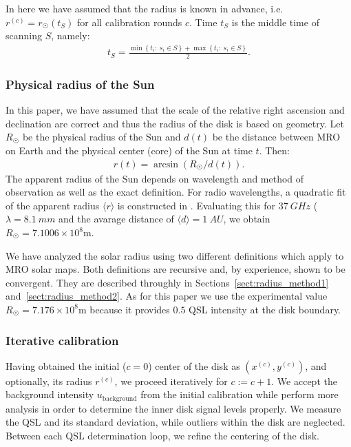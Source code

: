 \documentclass{aa}
\newcommand{\eqnl}[2]{\begin{eqnarray}\label{#1}#2\end{eqnarray}}
\newcommand{\ave}[1]{\langle #1 \rangle}
\renewcommand{\min}[1]{\operatorname{min} \left\{ #1 \right\}}
\renewcommand{\max}[1]{\operatorname{max} \left\{ #1 \right\}}
\newcommand{\s}[2]{{#1}_{\mathrm{#2}}}
\begin{document}
  In here we have assumed that the radius is known in advance, i.e. $r^{(c)} = r_{\astrosun}(t_S)$ for all calibration rounds $c$. Time $t_S$ is the middle time of scanning $S$, namely:
  \eqnl{initial_radius_time}{
  t_S = \frac{\min{t_i :\; s_i \in S} + \max{ t_i :\; s_i \in S}}{2} \text{.}
  }

  \subsubsection{Physical radius of the Sun}\label{sect:physical_radius}
  
  In this paper, we have assumed that the scale of the relative right ascension and declination are correct and thus the 
  radius of the disk is based on geometry. Let $R_{\astrosun}$ be the physical radius of the Sun and $d(t)$ be the distance 
  between MRO on Earth and the physical center (core) of the Sun at time $t$. Then:
  \eqnl{visual_angle}{
  r(t) = \arcsin \left( R_{\astrosun} / d(t) \right) \text{.}
  }
  The apparent radius of the Sun depends on wavelength and method of observation as well as the exact definition. For radio wavelengths, a quadratic fit 
  of the apparent radius $\ave r$ is constructed in \cite{Rozelot15}. Evaluating this for $\SI{37}{GHz}$ ($\lambda = 
  \SI{8.1}{mm}$ and the avarage distance of $\ave d = \SI{1}{AU}$, we obtain $R_{\astrosun} = 7.1006 \times 10^8 
  \mathrm{m}$.

  We have analyzed the solar radius using two different definitions which apply to MRO solar maps. Both definitions are 
  recursive and, by experience, shown to be convergent. They are described throughly in 
  Sections~\ref{sect:radius_method1} and~\ref{sect:radius_method2}. As for this paper we use the experimental value 
  $R_{\astrosun} = 7.176 \times 10^8 \mathrm{m}$ because it provides $0.5$ QSL intensity at the disk boundary.

  \subsubsection{Iterative calibration} \label{sect:further_optimization}

  Having obtained the initial ($c=0$) center of the disk as $(x^{(c)}, y^{(c)})$, and optionally, its radius $r^{(c)}$, we 
  proceed iteratively for $c:=c+1$. We accept the background intensity $\s{u}{background}$ from the initial calibration while perform 
  more analysis in order to determine the inner disk signal levels properly. We measure the QSL and its standard 
  deviation, while outliers within the disk are neglected. Between each QSL determination loop, we refine the centering 
  of the disk.
  
\end{document}
